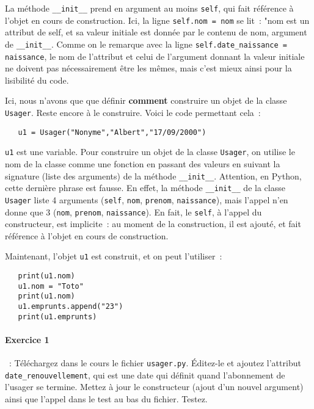 \documentclass{article}
\begin{document}
La méthode \texttt{\_\_init\_\_} prend en argument au moins \texttt{self}, qui fait référence à l'objet en cours de construction. Ici, la ligne \texttt{self.nom = nom} se lit~: "nom est un attribut de self, et sa valeur initiale est donnée par le contenu de nom, argument de \texttt{\_\_init\_\_}. Comme on le remarque avec la ligne \texttt{self.date\_naissance = naissance}, le nom de l'attribut et celui de l'argument donnant la valeur initiale ne doivent pas nécessairement être les mêmes, mais c'est mieux ainsi pour la lisibilité du code.

Ici, nous n'avons que que définir \textbf{comment} construire un objet de la classe \texttt{Usager}. Reste encore à le construire. Voici le code permettant cela~:

\begin{verbatim}
   u1 = Usager("Nonyme","Albert","17/09/2000")
\end{verbatim} 

\texttt{u1} est une variable. Pour construire un objet de la classe \texttt{Usager}, on utilise le nom de la classe comme une fonction en passant des valeurs en suivant la signature (liste des arguments) de la méthode \texttt{\_\_init\_\_}. Attention, en Python, cette dernière phrase est fausse. En effet, la méthode \texttt{\_\_init\_\_} de la classe \texttt{Usager} liste 4 arguments (\texttt{self}, \texttt{nom}, \texttt{prenom}, \texttt{naissance}), mais l'appel n'en donne que 3 (\texttt{nom}, \texttt{prenom}, \texttt{naissance}). En fait, le \texttt{self}, à l'appel du constructeur, est implicite~: au moment de la construction, il est ajouté, et fait référence à l'objet en cours de construction.

Maintenant, l'objet \texttt{u1} est construit, et on peut l'utiliser~:

\begin{verbatim}
   print(u1.nom)
   u1.nom = "Toto"
   print(u1.nom)
   u1.emprunts.append("23")
   print(u1.emprunts)
\end{verbatim} 

\paragraph{Exercice 1}~: Téléchargez dans le cours le fichier \texttt{usager.py}. \'Editez-le et ajoutez l'attribut \texttt{date\_renouvellement}, qui est une date qui définit quand l'abonnement de l'usager se termine. Mettez à jour le constructeur (ajout d'un nouvel argument) ainsi que l'appel dans le test au bas du fichier. Testez.
\end{document}
